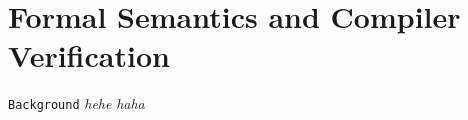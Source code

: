 \section{Formal Semantics and Compiler Verification}
\label{sec:background}

\texttt{Background}
\textit{hehe}
\textsl{haha}

